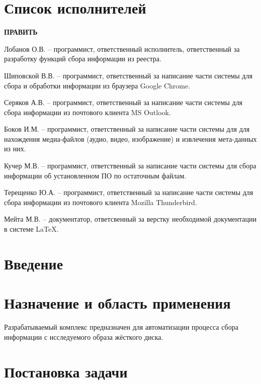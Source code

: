 


 
 
 
 \newpage
 \section*{Список исполнителей}\textbf{ПРАВИТЬ}
 
Лобанов О.В. -- программист, ответственный исполнитель, ответственный за разработку функций сбора информации из реестра. 

Шиповской В.В. -- программист, ответственный за написание части системы для сбора и обработки информации из браузера Google Chrome.

Серяков А.В. -- программист, ответственный за написание части системы для сбора информации из почтового клиента MS Outlook.

Боков И.М. -- программист, ответственный за написание части системы для для нахождения медиа-файлов (аудио, видео, изображение) и извлечения мета-данных из них.

Кучер М.В. -- программист, ответственный за написание части системы для сбора информации об установленном ПО по остаточным файлам.

Терещенко Ю.А. -- программист, ответственный за написание части системы для сбора информации из почтового клиента Mozilla Thunderbird.

Мейта М.В. -- документатор, ответсвенный за верстку необходимой документации в системе \LaTeX.

 
 \newpage
 \tableofcontents

 \newpage
 \section*{Введение}
 

 \section{Назначение и область применения}
Разрабатываемый комплекс предназначен для автоматизации процесса сбора информации с исследуемого образа жёсткого диска.

\section{Постановка задачи}
\setcounter{figure}{0}


